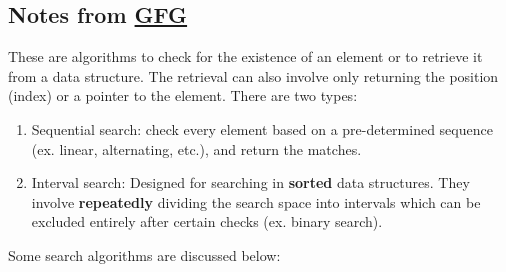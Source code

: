 \documentclass{report}
\begin{document}
\subsection*{Notes from \href{https://www.geeksforgeeks.org/searching-algorithms/}{GFG}}
These are algorithms to check for the existence of an element or to retrieve it from
a data structure. The retrieval can also involve only returning the position (index)
or a pointer to the element. There are two types:
\begin{enumerate}
    \item Sequential search: check every element based on a pre-determined sequence (ex. linear, alternating, etc.),
    and return the matches.
    \item Interval search: Designed for searching in \textbf{sorted} data structures.
    They involve \textbf{repeatedly} dividing the search space into intervals which
    can be excluded entirely after certain checks (ex. binary search).
\end{enumerate}
Some search algorithms are discussed below:
\end{document}
